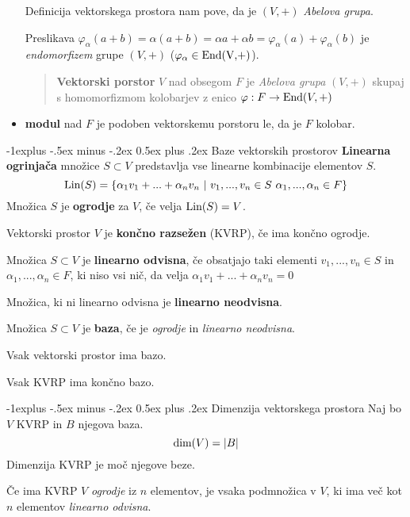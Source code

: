 \documentclass[a4paper,landscape]{article}
\makeatletter
\renewcommand{\subsection}{\@startsection{subsection}{2}{0mm}%
                                {-1explus -.5ex minus -.2ex}%
                                {0.5ex plus .2ex}%
                                {\normalfont\normalsize\bfseries}}
\makeatother
\begin{document}
\begin{multicols}{3}
\begin{itemize}
    Definicija vektorskega prostora nam pove, da je $(V,+)$ \emph{Abelova grupa}.

    Preslikava $\varphi_\alpha(a+b) = \alpha(a+b) = \alpha a + \alpha b = \varphi_\alpha(a) + \varphi_\alpha(b)$
    je \emph{endomorfizem} grupe $(V, +)$ ($\varphi_\alpha \in \textmd{End(V,+)}$).

    \begin{quotation}
        \textbf{Vektorski porstor} $V$ nad obsegom $F$ je \emph{Abelova grupa} $(V, +)$ skupaj s 
        homomorfizmom kolobarjev z enico $\varphi : F \to \textmd{End}(V, +)$
    \end{quotation}

    \item \textbf{modul} nad $F$ je podoben vektorskemu porstoru le, da je $F$ kolobar.
\end{itemize}

\subsection{Baze vektorskih prostorov}
\textbf{Linearna ogrinjača} množice $S \subset V$ predstavlja vse linearne kombinacije elementov $S$.
\[
    \textmd{Lin}(S) = \{\alpha_1 v_1 + ... + \alpha_n v_n \ | \ v_1, ..., v_n \in S \ \alpha_1, ..., \alpha_n \in F  \}
\]
Množica $S$ je \textbf{ogrodje} za $V$, če velja $\textmd{Lin}(S) = V$.

Vektorski prostor $V$ je \textbf{končno razsežen} (KVRP), če ima končno ogrodje.

Množica $S \subset V$ je \textbf{linearno odvisna}, če obsatjajo taki elementi $v_1, ..., v_n \in S$ in 
$\alpha_1,...,\alpha_n \in F$,
ki niso vsi nič, da velja $\alpha_1 v_1 + ... + \alpha_n v_n = 0$

Množica, ki ni linearno odvisna je \textbf{linearno neodvisna}.

Množica $S \subset V$ je \textbf{baza}, če je \emph{ogrodje} in \emph{linearno neodvisna}.

Vsak vektorski prostor ima bazo.

Vsak KVRP ima končno bazo.

\subsection{Dimenzija vektorskega prostora}
Naj bo $V$ KVRP in $B$ njegova baza.
\[\textmd{dim}(V) = |B|\]
Dimenzija KVRP je moč njegove beze.

Če ima KVRP $V$ \emph{ogrodje} iz $n$ elementov, je vsaka podmnožica v $V$, ki ima več kot $n$ elementov 
\emph{linearno odvisna}.


\end{multicols}
\end{document}
